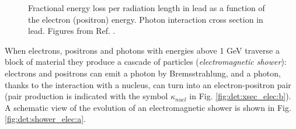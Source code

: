 \begin{figure}[ht]
\centering
{}
\caption{ Fractional energy loss per radiation length in lead as a function of the electron (positron) energy. 
 Photon interaction cross section in lead. Figures from Ref. \cite{Patrignani:2016xqp}. }
\label{fig:det:xsec_elec}
\end{figure}


When electrons, positrons and photons with energies above 1 GeV traverse a block of material they produce a cascade of particles (\textit{electromagnetic shower}): electrons and positrons can emit a photon by Bremsstrahlung, and a photon, thanks to the interaction with a nucleus, can turn into an electron-positron pair (pair production is indicated with the symbol $\kappa_{nucl}$ in Fig. \ref{fig:det:xsec_elec:b}). A schematic view of the evolution of an electromagnetic shower is shown  in Fig. \ref{fig:det:shower_elec:a}. 

